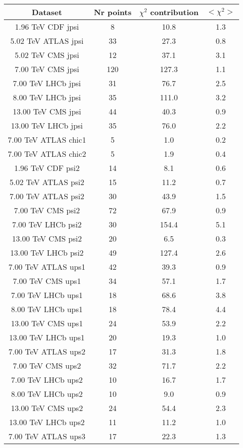 \begin{table}[h!]
\centering
\begin{tabular}{c|c|c|c}
Dataset & Nr points & $\chi^2$ contribution & $<\chi^2>$ \\
\hline
1.96 TeV CDF jpsi & 8 & 10.8 & 1.3 \\
5.02 TeV ATLAS jpsi & 33 & 27.3 & 0.8 \\
5.02 TeV CMS jpsi & 12 & 37.1 & 3.1 \\
7.00 TeV CMS jpsi & 120 & 127.3 & 1.1 \\
7.00 TeV LHCb jpsi & 31 & 76.7 & 2.5 \\
8.00 TeV LHCb jpsi & 35 & 111.0 & 3.2 \\
13.00 TeV CMS jpsi & 44 & 40.3 & 0.9 \\
13.00 TeV LHCb jpsi & 35 & 76.0 & 2.2 \\
7.00 TeV ATLAS chic1 & 5 & 1.0 & 0.2 \\
7.00 TeV ATLAS chic2 & 5 & 1.9 & 0.4 \\
1.96 TeV CDF psi2 & 14 & 8.1 & 0.6 \\
5.02 TeV ATLAS psi2 & 15 & 11.2 & 0.7 \\
7.00 TeV ATLAS psi2 & 30 & 43.9 & 1.5 \\
7.00 TeV CMS psi2 & 72 & 67.9 & 0.9 \\
7.00 TeV LHCb psi2 & 30 & 154.4 & 5.1 \\
13.00 TeV CMS psi2 & 20 & 6.5 & 0.3 \\
13.00 TeV LHCb psi2 & 49 & 127.4 & 2.6 \\
7.00 TeV ATLAS ups1 & 42 & 39.3 & 0.9 \\
7.00 TeV CMS ups1 & 34 & 57.1 & 1.7 \\
7.00 TeV LHCb ups1 & 18 & 68.6 & 3.8 \\
8.00 TeV LHCb ups1 & 18 & 78.4 & 4.4 \\
13.00 TeV CMS ups1 & 24 & 53.9 & 2.2 \\
13.00 TeV LHCb ups1 & 20 & 19.3 & 1.0 \\
7.00 TeV ATLAS ups2 & 17 & 31.3 & 1.8 \\
7.00 TeV CMS ups2 & 32 & 71.7 & 2.2 \\
7.00 TeV LHCb ups2 & 10 & 16.7 & 1.7 \\
8.00 TeV LHCb ups2 & 10 & 9.0 & 0.9 \\
13.00 TeV CMS ups2 & 24 & 54.4 & 2.3 \\
13.00 TeV LHCb ups2 & 11 & 11.2 & 1.0 \\
7.00 TeV ATLAS ups3 & 17 & 22.3 & 1.3 \\

\end{tabular}
\end{table}
